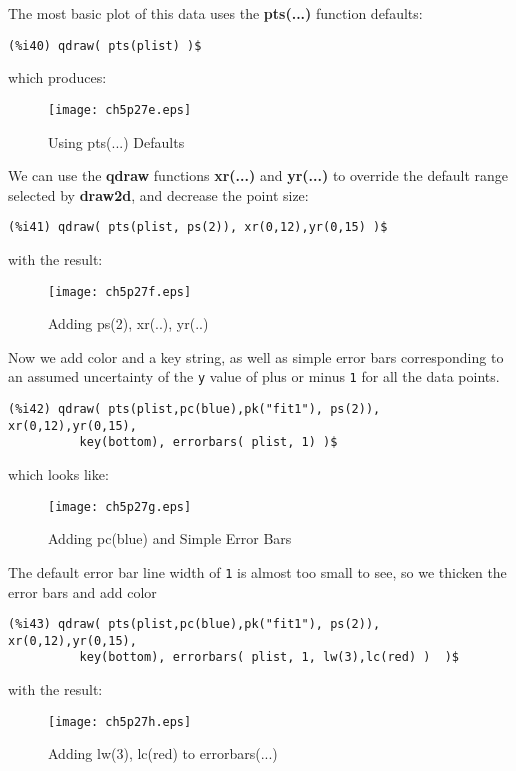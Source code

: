 \documentclass[12pt]{article}
\begin{document}
The most basic plot of this data uses the \textbf{pts(...)} function defaults:
\small
\begin{verbatim}
(%i40) qdraw( pts(plist) )$
\end{verbatim}
\normalsize
which produces:
\begin{figure} [h]
   \centerline{\texttt{[image: ch5p27e.eps]} }
	\caption{Using pts(...) Defaults}
\end{figure}      

\smallskip
We can use the \textbf{qdraw} functions \textbf{xr(...)} and \textbf{yr(...)}
  to override the default range selected by \textbf{draw2d}, and decrease the
  point size:
\small
\begin{verbatim}
(%i41) qdraw( pts(plist, ps(2)), xr(0,12),yr(0,15) )$
\end{verbatim}
\normalsize
with the result:
\begin{figure} [h]
   \centerline{\texttt{[image: ch5p27f.eps]} }
	\caption{Adding ps(2), xr(..), yr(..)}
\end{figure}      

\newpage
Now we add color and a key string, as well as simple error bars corresponding to
  an assumed uncertainty of the \verb|y| value of plus or minus \verb|1| for all
  the data points.
\small
\begin{verbatim}
(%i42) qdraw( pts(plist,pc(blue),pk("fit1"), ps(2)), xr(0,12),yr(0,15),
          key(bottom), errorbars( plist, 1) )$
\end{verbatim}
\normalsize
%
which looks like:
\begin{figure} [h]
   \centerline{\texttt{[image: ch5p27g.eps]} }
	\caption{Adding pc(blue) and Simple Error Bars }
\end{figure}      

\smallskip
The default error bar line width of \verb|1| is almost too small to see, so we thicken
  the error bars and add color
\small
\begin{verbatim}
(%i43) qdraw( pts(plist,pc(blue),pk("fit1"), ps(2)), xr(0,12),yr(0,15),
          key(bottom), errorbars( plist, 1, lw(3),lc(red) )  )$
\end{verbatim}
\normalsize
%
with the result:
\begin{figure} [h]
   \centerline{\texttt{[image: ch5p27h.eps]} }
	\caption{Adding lw(3), lc(red) to errorbars(...) }
\end{figure} 
     
\end{document}
